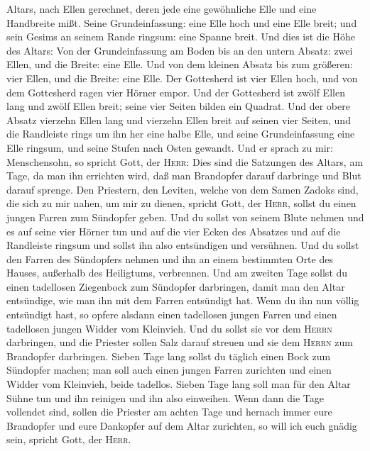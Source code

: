 Altars, nach Ellen gerechnet, deren jede eine gewöhnliche Elle und eine
Handbreite mißt. Seine Grundeinfassung: eine Elle hoch und eine Elle
breit; und sein Gesims an seinem Rande ringsum: eine Spanne breit.
 Und dies ist die Höhe des Altars: Von der
Grundeinfassung am Boden bis an den untern Absatz: zwei Ellen, und die
Breite: eine Elle. Und von dem kleinen Absatz bis zum größeren: vier
Ellen, und die Breite: eine Elle.  Der Gottesherd ist
vier Ellen hoch, und von dem Gottesherd ragen vier Hörner empor.
 Und der Gottesherd ist zwölf Ellen lang und zwölf Ellen
breit; seine vier Seiten bilden ein Quadrat.  Und der
obere Absatz vierzehn Ellen lang und vierzehn Ellen breit auf seinen
vier Seiten, und die Randleiste rings um ihn her eine halbe Elle, und
seine Grundeinfassung eine Elle ringsum, und seine Stufen nach Osten
gewandt.  Und er sprach zu mir: Menschensohn, so spricht
Gott, der \textsc{Herr}: Dies sind die Satzungen des Altars, am Tage, da
man ihn errichten wird, daß man Brandopfer darauf darbringe und Blut
darauf sprenge.  Den Priestern, den Leviten, welche von
dem Samen Zadoks sind, die sich zu mir nahen, um mir zu dienen, spricht
Gott, der \textsc{Herr}, sollst du einen jungen Farren zum Sündopfer
geben.  Und du sollst von seinem Blute nehmen und es auf
seine vier Hörner tun und auf die vier Ecken des Absatzes und auf die
Randleiste ringsum und sollst ihn also entsündigen und versühnen.
 Und du sollst den Farren des Sündopfers nehmen und ihn
an einem bestimmten Orte des Hauses, außerhalb des Heiligtums,
verbrennen.  Und am zweiten Tage sollst du einen
tadellosen Ziegenbock zum Sündopfer darbringen, damit man den Altar
entsündige, wie man ihn mit dem Farren entsündigt hat. 
Wenn du ihn nun völlig entsündigt hast, so opfere alsdann einen
tadellosen jungen Farren und einen tadellosen jungen Widder vom
Kleinvieh.  Und du sollst sie vor dem \textsc{Herrn}
darbringen, und die Priester sollen Salz darauf streuen und sie dem
\textsc{Herrn} zum Brandopfer darbringen.  Sieben Tage
lang sollst du täglich einen Bock zum Sündopfer machen; man soll auch
einen jungen Farren zurichten und einen Widder vom Kleinvieh, beide
tadellos.  Sieben Tage lang soll man für den Altar Sühne
tun und ihn reinigen und ihn also einweihen.  Wenn dann
die Tage vollendet sind, sollen die Priester am achten Tage und hernach
immer eure Brandopfer und eure Dankopfer auf dem Altar zurichten, so
will ich euch gnädig sein, spricht Gott, der \textsc{Herr}.

